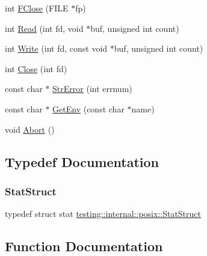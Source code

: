 \begin{DoxyCompactItemize}
\item 
int \hyperlink{namespacetesting_1_1internal_1_1posix_af4beeaaa8d62916d5e3b644a1ddfbd6b}{F\+Close} (F\+I\+LE $\ast$fp)
\item 
int \hyperlink{namespacetesting_1_1internal_1_1posix_a3c6ab13e581a56f1b02f3eb7536c97fd}{Read} (int fd, void $\ast$buf, unsigned int count)
\item 
int \hyperlink{namespacetesting_1_1internal_1_1posix_af4acf9f78d55f815a18b43786511abef}{Write} (int fd, const void $\ast$buf, unsigned int count)
\item 
int \hyperlink{namespacetesting_1_1internal_1_1posix_a15e5b8f2a535ef1b2529b85b861e4846}{Close} (int fd)
\item 
const char $\ast$ \hyperlink{namespacetesting_1_1internal_1_1posix_a4b77b14af6f4d18f83d303b98e9349c4}{Str\+Error} (int errnum)
\item 
const char $\ast$ \hyperlink{namespacetesting_1_1internal_1_1posix_a1d5e3da5a27eed25986859fa83cafe95}{Get\+Env} (const char $\ast$name)
\item 
void \hyperlink{namespacetesting_1_1internal_1_1posix_a69b8278c59359dd6a6f941b4643db9fb}{Abort} ()
\end{DoxyCompactItemize}


\subsection{Typedef Documentation}
\mbox{\label{namespacetesting_1_1internal_1_1posix_a8eb9f08d3af29941c2d2a964cfff3ecb}} 
\subsubsection{\texorpdfstring{Stat\+Struct}{StatStruct}}
{\footnotesize\ttfamily typedef struct stat \hyperlink{namespacetesting_1_1internal_1_1posix_a8eb9f08d3af29941c2d2a964cfff3ecb}{testing\+::internal\+::posix\+::\+Stat\+Struct}}



\subsection{Function Documentation}
\mbox{\label{namespacetesting_1_1internal_1_1posix_a69b8278c59359dd6a6f941b4643db9fb}} 
